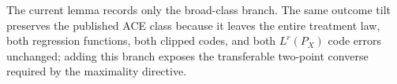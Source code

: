 The current lemma records only the broad-class branch. The same outcome tilt preserves the published ACE class because it leaves the entire treatment law, both regression functions, both clipped codes, and both \(L^r(P_X)\) code errors unchanged; adding this branch exposes the transferable two-point converse required by the maximality directive.